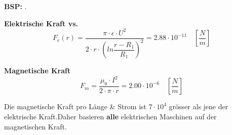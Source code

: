     \begin{minipage}{7cm}
        \textbf{BSP:}\newline
         .\hspace{3.5cm}
    \end{minipage}
    \begin{multicols}{2}
        \begin{minipage}{\linewidth}
           \textbf{Elektrische Kraft vs.}\newline
            \begin{equation*}
            F_e(r) = \dfrac{\pi\cdot\epsilon\cdot U^2}{2\cdot r\cdot\left(ln\dfrac{r-R_1}{R_1}\right)^2} = 2.88\cdot 10^{-11} \quad \left[\dfrac{N}{m}\right]
            \end{equation*}
        \end{minipage}

        \begin{minipage}{\linewidth}
            \textbf{Magnetische Kraft}\newline
            \begin{equation*}
             F_m = \dfrac{\mu_0\cdot I^2}{2\cdot\pi\cdot r} = 2.00 \cdot 10^{-6} \quad\left[\dfrac{N}{m}\right]
            \end{equation*}
        \end{minipage}        
    \end{multicols}
    
    \begin{minipage}{\linewidth}
        \vspace{0.5cm}
        Die magnetische Kraft pro Länge \& Strom ist $7 \cdot 10^4$ grösser als jene der elektrische Kraft.\newline Daher basieren \textbf{alle} elektrischen Maschinen auf der magnetischen Kraft.\newline 
    \end{minipage}
    
